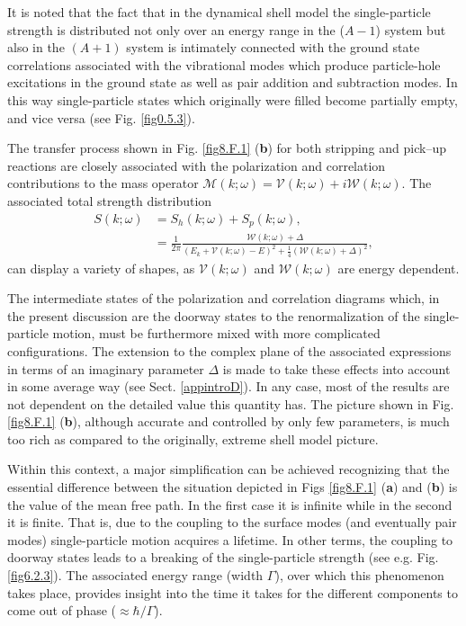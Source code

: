 It is noted that the fact that in the dynamical shell model the single-particle strength is distributed not only over an energy range in the ($A-1$) system but also in the $(A+1)$ system is intimately connected with the ground state correlations associated with the vibrational modes which produce particle-hole excitations in the ground state as well as  pair addition and subtraction modes. In this way single-particle states which originally were filled become partially empty, and vice versa (see Fig. \ref{fig0.5.3}).


The transfer process shown in Fig. \ref{fig8.F.1} (\textbf{b}) for both stripping and pick--up reactions are closely associated with the polarization and correlation contributions to the mass operator $\mathcal M(k;\omega)=\mathcal V(k;\omega)+i\mathcal W(k;\omega)$. The associated total strength distribution
 \begin{align}\label{eq5.8.1}
 \nonumber S(k;\omega)&=S_h(k;\omega)+S_p(k;\omega),\\
 &=\frac{1}{2\pi}\frac{\mathcal W(k;\omega)+\Delta}{(E_k+\mathcal V(k;\omega)-E)^2+\frac{1}{4}\left(\mathcal W(k;\omega)+\Delta\right)^2},
 \end{align}
can display a variety of shapes, as $\mathcal V(k;\omega)$ and $\mathcal W(k;\omega)$ are energy dependent.


The intermediate states of the polarization and correlation diagrams which, in the present discussion are the doorway states to the renormalization of the single-particle motion, must be furthermore mixed with more complicated configurations. The extension to the complex plane of the associated expressions in terms of an imaginary parameter $\Delta$ is made to take these effects into account in some average way (see Sect. \ref{appintroD}). In any case, most of the results are not dependent on the detailed value this quantity has. 
The picture shown in Fig. \ref{fig8.F.1} (\textbf{b}), although accurate and controlled by only few parameters, is much too rich as compared to the originally, extreme shell model picture. 

Within this context,
a major simplification can be achieved recognizing that the essential difference between the situation depicted in Figs \ref{fig8.F.1} (\textbf{a}) and (\textbf{b}) is the value of the mean free path. In the first case it is infinite while in the second it is finite. That is, due to the coupling to the surface modes (and eventually pair modes) single-particle motion acquires a lifetime. In other terms, the coupling to doorway states leads to a breaking of the single-particle strength (see e.g. Fig. \ref{fig6.2.3}). The associated energy range (width $\Gamma$), over which this phenomenon takes place, provides insight into the time it takes for the different components to come out of phase ($\approx \hbar/\Gamma$). 

